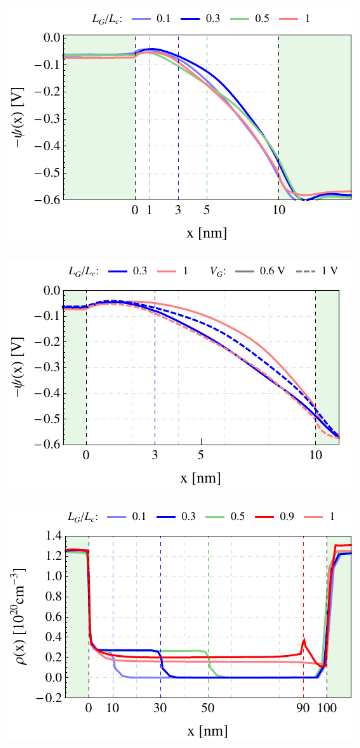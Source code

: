 \documentclass[11pt, a4paper]{article}
\begin{document}
\begin{figure}
	\begin{subfigure}{0.245\linewidth}
		\centering
		\includegraphics[width=1\linewidth]{potxPG10}
		\caption{}\label{fig:3:3a}
	\end{subfigure}
	\begin{subfigure}{0.245\linewidth}
		\centering
		\includegraphics[width=1\linewidth]{potxPG10vg0610_new}
		\caption{}\label{fig:3:5a}
	\end{subfigure}
	\begin{subfigure}{0.245\linewidth}
		\centering
		\includegraphics[width=1\linewidth]{ndxPG100}

\end{subfigure}
\end{figure}
\end{document}
